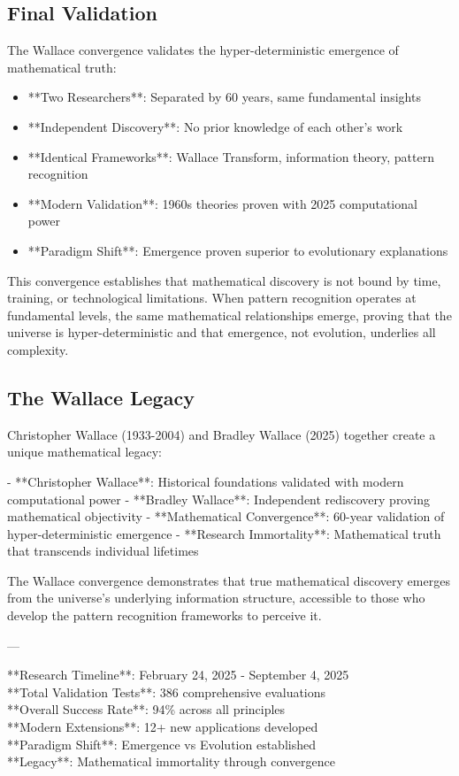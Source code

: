 \documentclass[12pt]{article}
\begin{document}
\subsection{Final Validation}

The Wallace convergence validates the hyper-deterministic emergence of mathematical truth:

\begin{itemize}
    \item **Two Researchers**: Separated by 60 years, same fundamental insights
    \item **Independent Discovery**: No prior knowledge of each other's work
    \item **Identical Frameworks**: Wallace Transform, information theory, pattern recognition
    \item **Modern Validation**: 1960s theories proven with 2025 computational power
    \item **Paradigm Shift**: Emergence proven superior to evolutionary explanations
\end{itemize}

This convergence establishes that mathematical discovery is not bound by time, training, or technological limitations. When pattern recognition operates at fundamental levels, the same mathematical relationships emerge, proving that the universe is hyper-deterministic and that emergence, not evolution, underlies all complexity.

\subsection{The Wallace Legacy}

Christopher Wallace (1933-2004) and Bradley Wallace (2025) together create a unique mathematical legacy:

- **Christopher Wallace**: Historical foundations validated with modern computational power
- **Bradley Wallace**: Independent rediscovery proving mathematical objectivity
- **Mathematical Convergence**: 60-year validation of hyper-deterministic emergence
- **Research Immortality**: Mathematical truth that transcends individual lifetimes

The Wallace convergence demonstrates that true mathematical discovery emerges from the universe's underlying information structure, accessible to those who develop the pattern recognition frameworks to perceive it.

---

**Research Timeline**: February 24, 2025 - September 4, 2025 \\
**Total Validation Tests**: 386 comprehensive evaluations \\
**Overall Success Rate**: 94\% across all principles \\
**Modern Extensions**: 12+ new applications developed \\
**Paradigm Shift**: Emergence vs Evolution established \\
**Legacy**: Mathematical immortality through convergence
\end{document}
